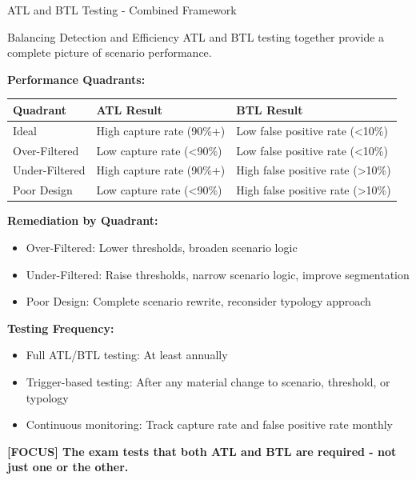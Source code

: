 \documentclass[11pt,a4paper]{beamer}
\newcommand{\examfocus}[1]{\textcolor{orange!80!black}{\textbf{[FOCUS] #1}}}
\begin{document}
\begin{frame}{ATL and BTL Testing - Combined Framework}
	\begin{block}{Balancing Detection and Efficiency}
		ATL and BTL testing together provide a complete picture of scenario performance.
	\end{block}
	
	\textbf{Performance Quadrants:}
	\begin{longtable}{p{}|p{}|p{}}
		\hline
		\rowcolor{lightgray}
		\textbf{Quadrant} & \textbf{ATL Result} & \textbf{BTL Result} \\
		\hline
		Ideal & High capture rate (90\%+) & Low false positive rate (<10\%) \\
		\hline
		Over-Filtered & Low capture rate (<90\%) & Low false positive rate (<10\%) \\
		\hline
		Under-Filtered & High capture rate (90\%+) & High false positive rate (>10\%) \\
		\hline
		Poor Design & Low capture rate (<90\%) & High false positive rate (>10\%) \\
		\hline
	\end{longtable}
	
	\textbf{Remediation by Quadrant:}
	\begin{itemize}
		\item Over-Filtered: Lower thresholds, broaden scenario logic
		\item Under-Filtered: Raise thresholds, narrow scenario logic, improve segmentation
		\item Poor Design: Complete scenario rewrite, reconsider typology approach
	\end{itemize}
	
	\textbf{Testing Frequency:}
	\begin{itemize}
		\item Full ATL/BTL testing: At least annually
		\item Trigger-based testing: After any material change to scenario, threshold, or typology
		\item Continuous monitoring: Track capture rate and false positive rate monthly
	\end{itemize}
	
	\examfocus{The exam tests that both ATL and BTL are required - not just one or the other.}
\end{frame}
	
\end{document}
